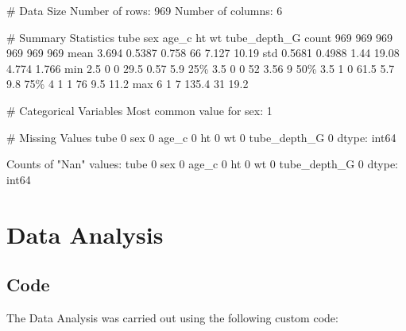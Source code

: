 \documentclass[11pt]{article}
\begin{document}
\begin{codeoutput}
\# Data Size
Number of rows: 969
Number of columns: 6

\# Summary Statistics
        tube    sex  age\_c    ht    wt  tube\_depth\_G
count    969    969    969   969   969           969
mean   3.694 0.5387  0.758    66 7.127         10.19
std   0.5681 0.4988   1.44 19.08 4.774         1.766
min      2.5      0      0  29.5  0.57           5.9
25\%      3.5      0      0    52  3.56             9
50\%      3.5      1      0  61.5   5.7           9.8
75\%        4      1      1    76   9.5          11.2
max        6      1      7 135.4    31          19.2

\# Categorical Variables
Most common value for sex: 1

\# Missing Values
tube            0
sex             0
age\_c           0
ht              0
wt              0
tube\_depth\_G    0
dtype: int64

Counts of "Nan" values: tube            0
sex             0
age\_c           0
ht              0
wt              0
tube\_depth\_G    0
dtype: int64
\end{codeoutput}

\section{Data Analysis}
\subsection{{Code}}
The Data Analysis was carried out using the following custom code:
\end{document}
